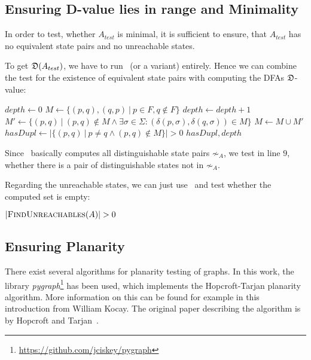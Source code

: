 \subsection{Ensuring D-value lies in range and Minimality}

In order to test, whether $A_{test}$ is minimal, it is sufficient to ensure, that $A_{test}$ has no equivalent state pairs and no unreachable states.

To get $\mathfrak{D}(A_{test})$, we have to run \CompDist\ (or a variant) entirely. Hence we can combine the test for the existence of equivalent state pairs with computing the DFAs $\mathfrak{D}$-value:
\vspace{0.2cm}
\begin{algorithmic}[1]
		\State $depth \gets 0$ 
		\State $M \gets \{ (p,q), (q,p)\ |\ p \in F, q \notin F \}$
		\Do
			\State $depth \gets depth + 1$
			\State $M' \gets \{ (p,q)\ |\ (p,q) \notin M \land \exists \sigma \in \Sigma \colon (\delta(p,\sigma), \delta(q,\sigma)) \in M \}$
			\State $M \gets M \cup M'$
		\State $hasDupl \gets | \{ (p,q)\ |\ p \neq q \land (p,q) \notin M \} | > 0$
		\State \Return $hasDupl, depth$
	\EndFunction
\end{algorithmic}
\vspace{0.2cm}
Since \CompDist\ basically computes all distinguishable state pairs $\not\sim_A$, we test in line $9$, whether there is a pair of distinguishable states not in $\not\sim_A$.

Regarding the unreachable states, we can just use \CompUnr\ and test whether the computed set is empty:
\vspace{0.2cm}
\begin{algorithmic}[1]
	\State \Return $|\textsc{FindUnreachables}(A)| > 0$
	\EndFunction
\end{algorithmic}

\subsection{Ensuring Planarity}\label{ch:3:sec:planarity}

There exist several algorithms for planarity testing of graphs. In this work, the library \emph{pygraph}\footnote{\url{https://github.com/jciskey/pygraph}} has been used, which implements the Hopcroft-Tarjan planarity algorithm. More information on this can be found for example in this~\cite{Koc93} introduction from William Kocay. The original paper describing the algorithm is by Hopcroft and Tarjan~\cite{HT74}.

